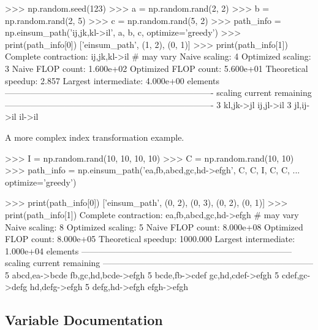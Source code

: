 \begin{DoxyVerb}
>>> np.random.seed(123)
>>> a = np.random.rand(2, 2)
>>> b = np.random.rand(2, 5)
>>> c = np.random.rand(5, 2)
>>> path_info = np.einsum_path('ij,jk,kl->il', a, b, c, optimize='greedy')
>>> print(path_info[0])
['einsum_path', (1, 2), (0, 1)]
>>> print(path_info[1])
  Complete contraction:  ij,jk,kl->il # may vary
         Naive scaling:  4
     Optimized scaling:  3
      Naive FLOP count:  1.600e+02
  Optimized FLOP count:  5.600e+01
   Theoretical speedup:  2.857
  Largest intermediate:  4.000e+00 elements
-------------------------------------------------------------------------
scaling                  current                                remaining
-------------------------------------------------------------------------
   3                   kl,jk->jl                                ij,jl->il
   3                   jl,ij->il                                   il->il


A more complex index transformation example.

>>> I = np.random.rand(10, 10, 10, 10)
>>> C = np.random.rand(10, 10)
>>> path_info = np.einsum_path('ea,fb,abcd,gc,hd->efgh', C, C, I, C, C,
...                            optimize='greedy')

>>> print(path_info[0])
['einsum_path', (0, 2), (0, 3), (0, 2), (0, 1)]
>>> print(path_info[1]) 
  Complete contraction:  ea,fb,abcd,gc,hd->efgh # may vary
         Naive scaling:  8
     Optimized scaling:  5
      Naive FLOP count:  8.000e+08
  Optimized FLOP count:  8.000e+05
   Theoretical speedup:  1000.000
  Largest intermediate:  1.000e+04 elements
--------------------------------------------------------------------------
scaling                  current                                remaining
--------------------------------------------------------------------------
   5               abcd,ea->bcde                      fb,gc,hd,bcde->efgh
   5               bcde,fb->cdef                         gc,hd,cdef->efgh
   5               cdef,gc->defg                            hd,defg->efgh
   5               defg,hd->efgh                               efgh->efgh
\end{DoxyVerb}
 

\subsection{Variable Documentation}
\mbox{\label{namespacenumpy_1_1core_1_1einsumfunc_ad932513c04deddd5dd21f9797d629a3c}} 
